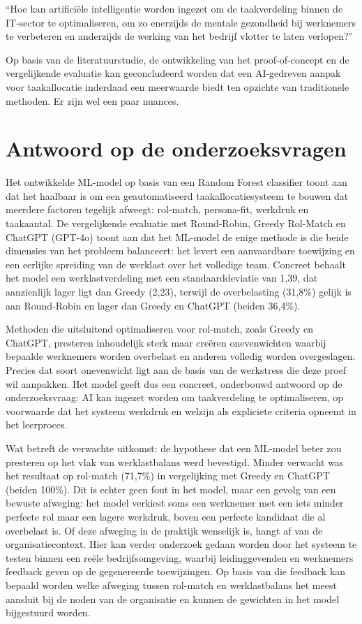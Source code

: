\vspace{0.5em}``Hoe kan artificiële intelligentie worden ingezet om de taakverdeling binnen de IT-sector te optimaliseren, om zo enerzijds de mentale gezondheid bij werknemers te verbeteren en anderzijds de werking van het bedrijf vlotter te laten verlopen?''

Op basis van de literatuurstudie, de ontwikkeling van het proof-of-concept en de vergelijkende evaluatie kan geconcludeerd worden dat een AI-gedreven aanpak voor taakallocatie inderdaad een meerwaarde biedt ten opzichte van traditionele methoden. Er zijn wel een paar nuances.

\section{Antwoord op de onderzoeksvragen}
\vspace{1em}Het ontwikkelde ML-model op basis van een Random Forest classifier toont aan dat het haalbaar is om een geautomatiseerd taakallocatiesysteem te bouwen dat meerdere factoren tegelijk afweegt: rol-match, persona-fit, werkdruk en taakaantal. De vergelijkende evaluatie met Round-Robin, Greedy Rol-Match en ChatGPT (GPT-4o) toont aan dat het ML-model de enige methode is die beide dimensies van het probleem balanceert: het levert een aanvaardbare toewijzing en een eerlijke spreiding van de werklast over het volledige team. Concreet behaalt het model een werklastverdeling met een standaarddeviatie van 1,39, dat aanzienlijk lager ligt dan Greedy (2,23), terwijl de overbelasting (31,8\%) gelijk is aan Round-Robin en lager dan Greedy en ChatGPT (beiden 36,4\%).

Methoden die uitsluitend optimaliseren voor rol-match, zoals Greedy en ChatGPT, presteren inhoudelijk sterk maar creëren onevenwichten waarbij bepaalde werknemers worden overbelast en anderen volledig worden overgeslagen. Precies dat soort onevenwicht ligt aan de basis van de werkstress die deze proef wil aanpakken. Het model geeft dus een concreet, onderbouwd antwoord op de onderzoeksvraag: AI kan ingezet worden om taakverdeling te optimaliseren, op voorwaarde dat het systeem werkdruk en welzijn als expliciete criteria opneemt in het leerproces.

Wat betreft de verwachte uitkomst: de hypothese dat een ML-model beter zou presteren op het vlak van werklastbalans werd bevestigd. Minder verwacht was het resultaat op rol-match (71,7\%) in vergelijking met Greedy en ChatGPT (beiden 100\%). Dit is echter geen fout in het model, maar een gevolg van een bewuste afweging: het model verkiest soms een werknemer met een iets minder perfecte rol maar een lagere werkdruk, boven een perfecte kandidaat die al overbelast is. Of deze afweging in de praktijk wenselijk is, hangt af van de organisatiecontext. Hier kan verder onderzoek gedaan worden door het systeem te testen binnen een reële bedrijfsomgeving, waarbij leidinggevenden en werknemers feedback geven op de gegenereerde toewijzingen. Op basis van die feedback kan bepaald worden welke afweging tussen rol-match en werklastbalans het meest aansluit bij de noden van de organisatie en kunnen de gewichten in het model bijgestuurd worden.

